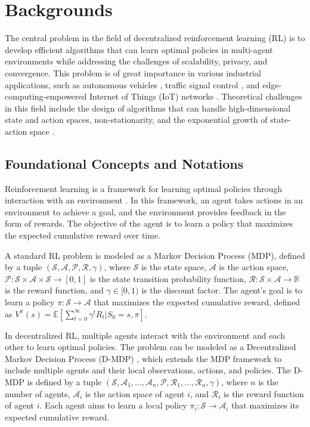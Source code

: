 \section{Backgrounds}

The central problem in the field of decentralized reinforcement learning (RL) is to develop efficient algorithms that can learn optimal policies in multi-agent environments while addressing the challenges of scalability, privacy, and convergence. This problem is of great importance in various industrial applications, such as autonomous vehicles \citep{duan2022autonomous}, traffic signal control \citep{yang2021an}, and edge-computing-empowered Internet of Things (IoT) networks \citep{lei2022adaptive}. Theoretical challenges in this field include the design of algorithms that can handle high-dimensional state and action spaces, non-stationarity, and the exponential growth of state-action space \citep{adams2020resolving}.

\subsection{Foundational Concepts and Notations}

Reinforcement learning is a framework for learning optimal policies through interaction with an environment \citep{sutton2005reinforcement}. In this framework, an agent takes actions in an environment to achieve a goal, and the environment provides feedback in the form of rewards. The objective of the agent is to learn a policy that maximizes the expected cumulative reward over time.

A standard RL problem is modeled as a Markov Decision Process (MDP), defined by a tuple $(\mathcal{S}, \mathcal{A}, \mathcal{P}, \mathcal{R}, \gamma)$, where $\mathcal{S}$ is the state space, $\mathcal{A}$ is the action space, $\mathcal{P}: \mathcal{S} \times \mathcal{A} \times \mathcal{S} \rightarrow [0, 1]$ is the state transition probability function, $\mathcal{R}: \mathcal{S} \times \mathcal{A} \rightarrow \mathbb{R}$ is the reward function, and $\gamma \in [0, 1)$ is the discount factor. The agent's goal is to learn a policy $\pi: \mathcal{S} \rightarrow \mathcal{A}$ that maximizes the expected cumulative reward, defined as $V^\pi(s) = \mathbb{E}\left[\sum_{t=0}^{\infty} \gamma^t R_t | S_0 = s, \pi\right]$.

In decentralized RL, multiple agents interact with the environment and each other to learn optimal policies. The problem can be modeled as a Decentralized Markov Decision Process (D-MDP) \citep{lu2021decentralized}, which extends the MDP framework to include multiple agents and their local observations, actions, and policies. The D-MDP is defined by a tuple $(\mathcal{S}, \mathcal{A}_1, \dots, \mathcal{A}_n, \mathcal{P}, \mathcal{R}_1, \dots, \mathcal{R}_n, \gamma)$, where $n$ is the number of agents, $\mathcal{A}_i$ is the action space of agent $i$, and $\mathcal{R}_i$ is the reward function of agent $i$. Each agent aims to learn a local policy $\pi_i: \mathcal{S} \rightarrow \mathcal{A}_i$ that maximizes its expected cumulative reward.

